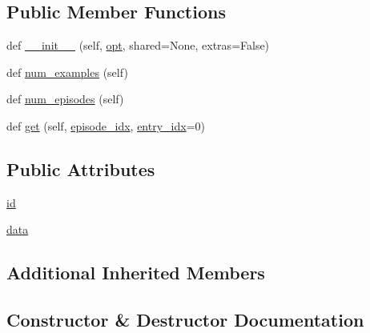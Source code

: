 \subsection*{Public Member Functions}
\begin{DoxyCompactItemize}
\item 
def \hyperlink{classparlai_1_1tasks_1_1dialogue__nli_1_1agents_1_1DialogueNliTeacher_ab6931a1fbc88ffc407f35ba72cc44b76}{\+\_\+\+\_\+init\+\_\+\+\_\+} (self, \hyperlink{classparlai_1_1core_1_1agents_1_1Teacher_a3ce6243860ce978a897922863ed32fa4}{opt}, shared=None, extras=False)
\item 
def \hyperlink{classparlai_1_1tasks_1_1dialogue__nli_1_1agents_1_1DialogueNliTeacher_a54d9ea8b89d8b5b91c913612fba74726}{num\+\_\+examples} (self)
\item 
def \hyperlink{classparlai_1_1tasks_1_1dialogue__nli_1_1agents_1_1DialogueNliTeacher_a1277b756af5d3ca234c77526a7bfb5e2}{num\+\_\+episodes} (self)
\item 
def \hyperlink{classparlai_1_1tasks_1_1dialogue__nli_1_1agents_1_1DialogueNliTeacher_aa3dfbefa7098aa0336896dd7ac5698b9}{get} (self, \hyperlink{classparlai_1_1core_1_1teachers_1_1FixedDialogTeacher_afd4ebab8063eb42d182d30a1a41f133e}{episode\+\_\+idx}, \hyperlink{classparlai_1_1core_1_1teachers_1_1FixedDialogTeacher_ae3201b15f3c3b46a2f3511bad9b43e7d}{entry\+\_\+idx}=0)
\end{DoxyCompactItemize}
\subsection*{Public Attributes}
\begin{DoxyCompactItemize}
\item 
\hyperlink{classparlai_1_1tasks_1_1dialogue__nli_1_1agents_1_1DialogueNliTeacher_aec219032386350b637684f9ab46a09ab}{id}
\item 
\hyperlink{classparlai_1_1tasks_1_1dialogue__nli_1_1agents_1_1DialogueNliTeacher_ae213e3aeb7ef16760a0c62ff1f77454e}{data}
\end{DoxyCompactItemize}
\subsection*{Additional Inherited Members}


\subsection{Constructor \& Destructor Documentation}
\mbox{\label{classparlai_1_1tasks_1_1dialogue__nli_1_1agents_1_1DialogueNliTeacher_ab6931a1fbc88ffc407f35ba72cc44b76}} 
